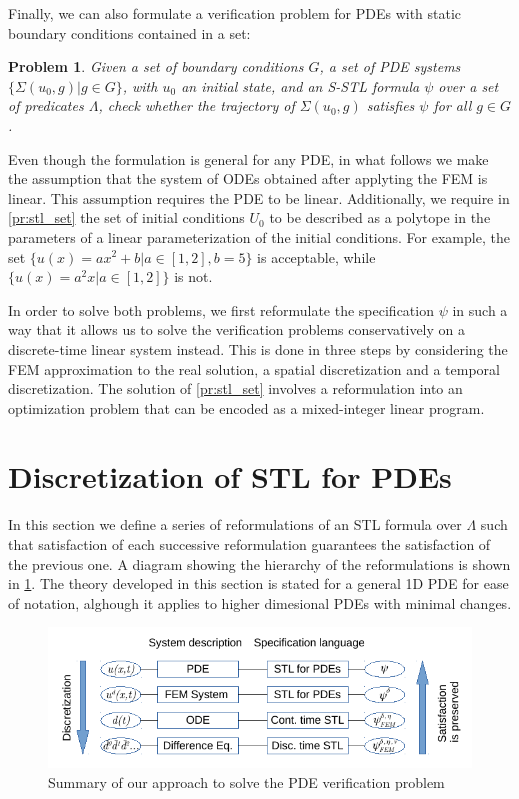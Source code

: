 \documentclass[letterpaper, 10 pt, conference]{ieeeconf/ieeeconf}
\newtheorem{problem}{Problem}
\begin{document}
Finally, we can also formulate a verification problem for PDEs with static
boundary conditions contained in a set:

\begin{problem}
\label{pr:stl_bound_set}
    Given a set of boundary conditions $G$, a set of PDE systems
    $\{\Sigma(u_0, g) | g \in G\}$, with $u_0$
    an initial state, and an S-STL formula $\psi$ over a set of
    predicates $\Lambda$, check whether the trajectory of $\Sigma(u_0, g)$
    satisfies $\psi$ for all $g \in G$.
\end{problem}

Even though the formulation is general for any PDE, in what follows we make the
assumption that the system of ODEs obtained after applyting the FEM is linear.
This assumption requires the PDE
to be linear. Additionally, we require in \cref{pr:stl_set} the set of initial
conditions $U_0$ to be described as a polytope in the parameters of a
linear parameterization of the initial conditions. For example, the set $\{u(x)
= a x^2 + b | a \in [1,2], b = 5\}$ is acceptable, while $\{u(x) = a^2 x |
a \in [1,2]\}$ is not.

In order to solve both problems, we first reformulate the specification $\psi$
in such a way that it allows us to solve the verification problems
conservatively on a discrete-time linear system instead. This is done in three
steps by considering the FEM approximation to the real solution, a spatial
discretization and a temporal discretization. The solution of \cref{pr:stl_set}
involves a reformulation into an optimization problem that can be encoded as a
mixed-integer linear program.

\section{Discretization of STL for PDEs}
\label{sec:formally_correct_discretization_of_pdestl}

In this section we define a series of reformulations of an STL formula over
$\Lambda$ such that satisfaction of each successive reformulation guarantees the
satisfaction of the previous one. A diagram showing the hierarchy of the
reformulations is shown in \cref{fig:diagram}. The theory developed in this section is stated
for a general 1D PDE for ease of notation, alghough it applies to higher dimesional PDEs
with minimal changes.

\begin{figure}[!t]
    \centering 
    \includegraphics[width=0.99\columnwidth]{diagram.png}
    \caption{Summary of our approach to solve the PDE verification problem }
    \label{fig:diagram}
\end{figure}
\end{document}
